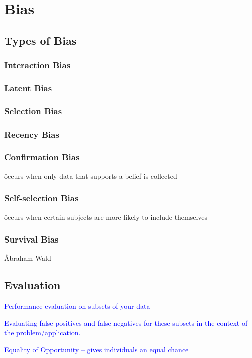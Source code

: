 \section{Bias}
\label{sec:data_bias_overview}

\subsection{Types of Bias}

\subsubsection{Interaction Bias}

\subsubsection{Latent Bias}

\subsubsection{Selection Bias}

\subsubsection{Recency Bias}

\subsubsection{Confirmation Bias}

\r{occurs when only data that supports a belief is collected}

\subsubsection{Self-selection Bias}

\r{occurs when certain subjects are more likely to include themselves}

\subsubsection{Survival Bias}

\r{Abraham Wald}

\subsection{Evaluation}

\textcolor{blue}{Performance evaluation on subsets of your data}

\textcolor{blue}{Evaluating false positives and false negatives for these subsets in the context of the problem/application.}

\textcolor{blue}{Equality of Opportunity -- gives individuals an equal chance}